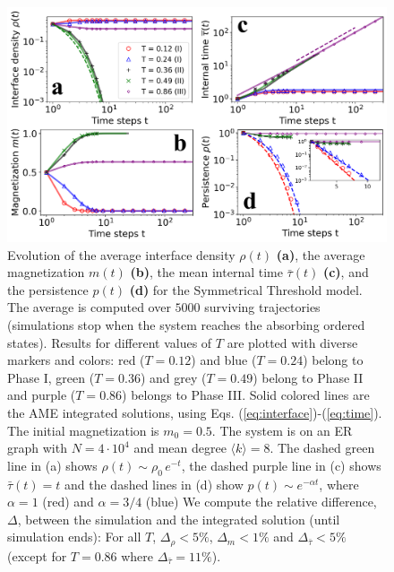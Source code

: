 \begin{figure}
	\centering \captionsetup{font=sf}
	\includegraphics[width=\textwidth]{Figs/Aging_STM/FIG3.pdf}
	\caption[Symmetrical Threshold model dynamics in random networks]{\label{fig:evolution_random} Evolution of the average interface density $\rho(t)$ \textbf{(a)}, the average magnetization $m(t)$ \textbf{(b)}, the mean internal time $\bar{\tau}(t)$ \textbf{(c)}, and the persistence $p(t)$ \textbf{(d)} for the Symmetrical Threshold model. The average is computed over $5000$ surviving trajectories (simulations stop when the system reaches the absorbing ordered states). Results for different values of $T$ are plotted with diverse markers and colors: red ($T = 0.12$) and blue ($T = 0.24$) belong to Phase I, green ($T = 0.36$) and grey ($T = 0.49$) belong to Phase II and purple ($T = 0.86$) belongs to Phase III. Solid colored lines are the AME integrated solutions, using Eqs. (\ref{eq:interface})-(\ref{eq:time}). The initial magnetization is $m_0 = 0.5$. The system is on an ER graph with $N = 4 \cdot 10^4$ and mean degree $\langle k \rangle = 8$. The dashed green line in (a) shows $\rho(t) \sim \rho_0 \, e^{-t}$, the dashed purple line in (c) shows $\bar{\tau}(t) = t$ and the dashed lines in (d) show $p(t) \sim e^{-\alpha t}$, where $\alpha = 1$ (red) and $\alpha = 3/4$ (blue) 
	We compute the relative difference, $\Delta$, between the simulation and the integrated solution  (until simulation ends): For all $T$, $\Delta_{\rho} < 5\%$, $\Delta_{m} < 1\%$ and $\Delta_{\bar{\tau}} < 5\%$ (except for $T = 0.86$ where $\Delta_{\bar{\tau}} = 11\%$).}
\end{figure}

